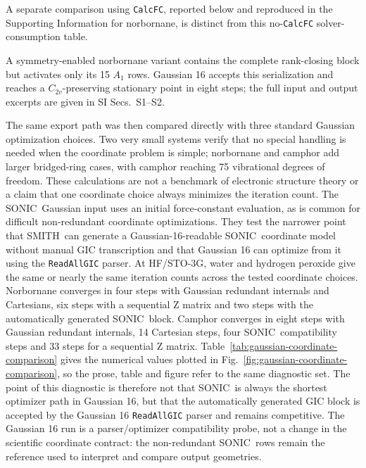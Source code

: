 \documentclass[journal=jctcce,manuscript=article,layout=traditional]{achemso}
\newcommand{\SONIC}{SONIC}
\newcommand{\SMITH}{\textsc{SMITH}}
\theoremstyle{definition}
\begin{document}
A separate comparison using \texttt{CalcFC}, reported below and reproduced in
the Supporting Information for norbornane, is distinct from this
no-\texttt{CalcFC} solver-consumption table.

A symmetry-enabled norbornane variant contains the complete rank-closing block
but activates only its 15 \(A_1\) rows.  Gaussian 16 accepts this serialization
and reaches a \(C_{2v}\)-preserving stationary point in eight steps; the full
input and output excerpts are given in SI Secs.~S1--S2.

The same export path was then compared directly with three standard Gaussian
optimization choices.  Two very small systems verify that no special handling
is needed when the coordinate problem is simple; norbornane and camphor add
larger bridged-ring cases, with camphor reaching 75 vibrational degrees of
freedom.  These calculations
are not a benchmark of electronic
structure theory or a claim that one coordinate choice always minimizes the
iteration count.  The \SONIC\ Gaussian input uses an initial force-constant
evaluation, as is common for difficult non-redundant coordinate optimizations.
They test the narrower point that \SMITH\ can generate a
Gaussian-16-readable \SONIC\ coordinate model without manual GIC transcription and
that Gaussian 16 can optimize from it using the \texttt{ReadAllGIC}
parser.  At HF/STO-3G, water and hydrogen peroxide give the same or nearly the
same iteration counts across the tested coordinate choices.  Norbornane
converges in four steps with Gaussian redundant internals and Cartesians, six
steps with a sequential Z matrix and two steps with the automatically
generated \SONIC\ block.  Camphor converges in eight steps with Gaussian
redundant internals, 14 Cartesian steps, four \SONIC\ compatibility steps and 33 steps for a
sequential Z matrix.  Table~\ref{tab:gaussian-coordinate-comparison} gives the
numerical values plotted in Fig.~\ref{fig:gaussian-coordinate-comparison}, so
the prose, table and figure refer to the same diagnostic set.  The point of this
diagnostic is therefore not that
\SONIC\ is always the shortest optimizer path in Gaussian 16, but that the
automatically generated GIC block is accepted by the Gaussian 16
\texttt{ReadAllGIC} parser and remains competitive.  The Gaussian 16 run is a
parser/optimizer compatibility probe, not a change in the scientific coordinate
contract: the non-redundant \SONIC\ rows remain the reference used to interpret
and compare output geometries.
\end{document}
